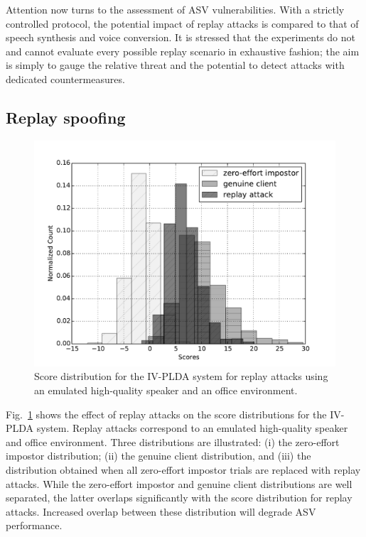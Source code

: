 

Attention now turns to the assessment of ASV vulnerabilities.  With a strictly controlled protocol, the potential impact of replay attacks is compared to that of speech synthesis and voice conversion.  It is stressed that the experiments do not and cannot evaluate every possible replay scenario in exhaustive fashion; the aim is simply to gauge the relative threat and the potential to detect attacks with dedicated countermeasures. 


\subsection{Replay spoofing}

\begin{figure}
	\centering
	\includegraphics[width=1\linewidth]{Figs/dist_IV_off.pdf}
	\caption{Score distribution for the IV-PLDA system for replay attacks using an emulated high-quality speaker and an office environment.}
	\label{fig::Dist_IV}
\end{figure}


Fig.~\ref{fig::Dist_IV} shows the effect of replay attacks on the score distributions for the IV-PLDA system.  Replay attacks correspond to an emulated high-quality speaker and office environment.  Three distributions are illustrated: (i) the zero-effort impostor distribution; (ii) the genuine client distribution, and (iii) the distribution obtained when all zero-effort impostor trials are replaced with replay attacks.  While the zero-effort impostor and genuine client distributions are well separated, the latter overlaps significantly with the score distribution for replay attacks.  Increased overlap between these distribution will degrade ASV performance.



